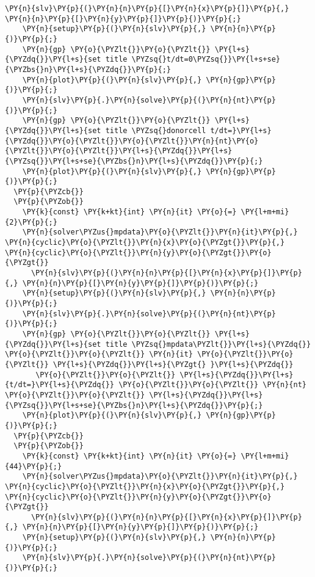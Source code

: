 \begin{Verbatim}[commandchars=\\\{\}]
      \PY{n}{slv}\PY{p}{(}\PY{n}{n}\PY{p}{[}\PY{n}{x}\PY{p}{]}\PY{p}{,} \PY{n}{n}\PY{p}{[}\PY{n}{y}\PY{p}{]}\PY{p}{)}\PY{p}{;}
    \PY{n}{setup}\PY{p}{(}\PY{n}{slv}\PY{p}{,} \PY{n}{n}\PY{p}{)}\PY{p}{;}
    \PY{n}{gp} \PY{o}{\PYZlt{}}\PY{o}{\PYZlt{}} \PY{l+s}{\PYZdq{}}\PY{l+s}{set title \PYZsq{}t/dt=0\PYZsq{}}\PY{l+s+se}{\PYZbs{}n}\PY{l+s}{\PYZdq{}}\PY{p}{;}
    \PY{n}{plot}\PY{p}{(}\PY{n}{slv}\PY{p}{,} \PY{n}{gp}\PY{p}{)}\PY{p}{;}
    \PY{n}{slv}\PY{p}{.}\PY{n}{solve}\PY{p}{(}\PY{n}{nt}\PY{p}{)}\PY{p}{;}
    \PY{n}{gp} \PY{o}{\PYZlt{}}\PY{o}{\PYZlt{}} \PY{l+s}{\PYZdq{}}\PY{l+s}{set title \PYZsq{}donorcell t/dt=}\PY{l+s}{\PYZdq{}}\PY{o}{\PYZlt{}}\PY{o}{\PYZlt{}}\PY{n}{nt}\PY{o}{\PYZlt{}}\PY{o}{\PYZlt{}}\PY{l+s}{\PYZdq{}}\PY{l+s}{\PYZsq{}}\PY{l+s+se}{\PYZbs{}n}\PY{l+s}{\PYZdq{}}\PY{p}{;}
    \PY{n}{plot}\PY{p}{(}\PY{n}{slv}\PY{p}{,} \PY{n}{gp}\PY{p}{)}\PY{p}{;}
  \PY{p}{\PYZcb{}} 
  \PY{p}{\PYZob{}}
    \PY{k}{const} \PY{k+kt}{int} \PY{n}{it} \PY{o}{=} \PY{l+m+mi}{2}\PY{p}{;}
    \PY{n}{solver\PYZus{}mpdata}\PY{o}{\PYZlt{}}\PY{n}{it}\PY{p}{,} \PY{n}{cyclic}\PY{o}{\PYZlt{}}\PY{n}{x}\PY{o}{\PYZgt{}}\PY{p}{,} \PY{n}{cyclic}\PY{o}{\PYZlt{}}\PY{n}{y}\PY{o}{\PYZgt{}}\PY{o}{\PYZgt{}} 
      \PY{n}{slv}\PY{p}{(}\PY{n}{n}\PY{p}{[}\PY{n}{x}\PY{p}{]}\PY{p}{,} \PY{n}{n}\PY{p}{[}\PY{n}{y}\PY{p}{]}\PY{p}{)}\PY{p}{;} 
    \PY{n}{setup}\PY{p}{(}\PY{n}{slv}\PY{p}{,} \PY{n}{n}\PY{p}{)}\PY{p}{;} 
    \PY{n}{slv}\PY{p}{.}\PY{n}{solve}\PY{p}{(}\PY{n}{nt}\PY{p}{)}\PY{p}{;}
    \PY{n}{gp} \PY{o}{\PYZlt{}}\PY{o}{\PYZlt{}} \PY{l+s}{\PYZdq{}}\PY{l+s}{set title \PYZsq{}mpdata\PYZlt{}}\PY{l+s}{\PYZdq{}} \PY{o}{\PYZlt{}}\PY{o}{\PYZlt{}} \PY{n}{it} \PY{o}{\PYZlt{}}\PY{o}{\PYZlt{}} \PY{l+s}{\PYZdq{}}\PY{l+s}{\PYZgt{} }\PY{l+s}{\PYZdq{}}
       \PY{o}{\PYZlt{}}\PY{o}{\PYZlt{}} \PY{l+s}{\PYZdq{}}\PY{l+s}{t/dt=}\PY{l+s}{\PYZdq{}} \PY{o}{\PYZlt{}}\PY{o}{\PYZlt{}} \PY{n}{nt} \PY{o}{\PYZlt{}}\PY{o}{\PYZlt{}} \PY{l+s}{\PYZdq{}}\PY{l+s}{\PYZsq{}}\PY{l+s+se}{\PYZbs{}n}\PY{l+s}{\PYZdq{}}\PY{p}{;}
    \PY{n}{plot}\PY{p}{(}\PY{n}{slv}\PY{p}{,} \PY{n}{gp}\PY{p}{)}\PY{p}{;}
  \PY{p}{\PYZcb{}} 
  \PY{p}{\PYZob{}}
    \PY{k}{const} \PY{k+kt}{int} \PY{n}{it} \PY{o}{=} \PY{l+m+mi}{44}\PY{p}{;}
    \PY{n}{solver\PYZus{}mpdata}\PY{o}{\PYZlt{}}\PY{n}{it}\PY{p}{,} \PY{n}{cyclic}\PY{o}{\PYZlt{}}\PY{n}{x}\PY{o}{\PYZgt{}}\PY{p}{,} \PY{n}{cyclic}\PY{o}{\PYZlt{}}\PY{n}{y}\PY{o}{\PYZgt{}}\PY{o}{\PYZgt{}} 
      \PY{n}{slv}\PY{p}{(}\PY{n}{n}\PY{p}{[}\PY{n}{x}\PY{p}{]}\PY{p}{,} \PY{n}{n}\PY{p}{[}\PY{n}{y}\PY{p}{]}\PY{p}{)}\PY{p}{;} 
    \PY{n}{setup}\PY{p}{(}\PY{n}{slv}\PY{p}{,} \PY{n}{n}\PY{p}{)}\PY{p}{;} 
    \PY{n}{slv}\PY{p}{.}\PY{n}{solve}\PY{p}{(}\PY{n}{nt}\PY{p}{)}\PY{p}{;} 

\end{Verbatim}
